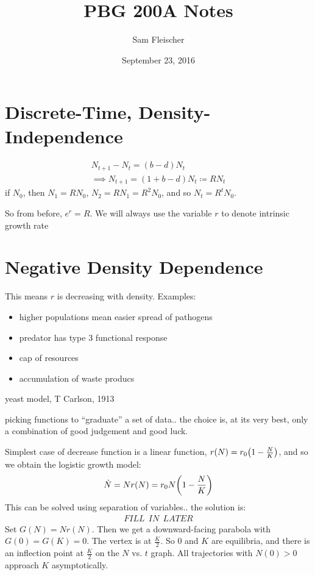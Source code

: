 \documentclass{article}
\title{PBG 200A Notes}
\author{Sam Fleischer}
\date{September 23, 2016}
\begin{document}
    \maketitle

    \section{Discrete-Time, Density-Independence}

    \begin{align*}
        N_{t+1} - N_t = (b - d)N_t \\
        \implies N_{t+1} = (1 + b - d)N_t \coloneqq RN_t
    \end{align*}
    if $N_0$, then $N_1 = RN_0$, $N_2 = RN_1 = R^2N_0$, and so $N_t = R^tN_0$.

    So from before, $e^r = R$.  We will always use the variable $r$ to denote intrinsic growth rate

    \section{Negative Density Dependence}

    This means $r$ is decreasing with density.  Examples:
    \begin{itemize}
        \item higher populations mean easier spread of pathogens
        \item predator has type 3 functional response
        \item cap of resources
        \item accumulation of waste producs
    \end{itemize}
    yeast model, T Carlson, 1913

    picking functions to ``graduate'' a set of data.. the choice is, at its very best, only a combination of good judgement and good luck.

    Simplest case of decrease function is a linear function, 
    $r(N) = r_0\qty(1 - \frac{N}{K})$, and so we obtain the logistic growth model:
    \begin{align*}
        \dot{N} = Nr(N) = r_0N\qty(1 - \frac{N}{K})
    \end{align*}
    This can be solved using separation of variables.. the solution is:
    \begin{align*}
        FILL\ \ IN\ \ LATER
    \end{align*}
    Set $G(N) = Nr(N)$.  Then we get a downward-facing parabola with $G(0) = G(K) = 0$.  The vertex is at $\frac{K}{2}$.  So $0$ and $K$ are equilibria, and there is an inflection point at $\frac{K}{2}$ on the $N$ vs. $t$ graph.  All trajectories with $N(0) > 0$ approach $K$ asymptotically.
\end{document}
